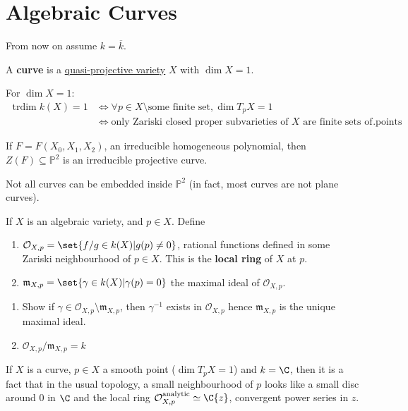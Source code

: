 \documentclass{article}
\newcommand{\proj}{\mathbb{P}}
\DeclareMathOperator{\trdim}{trdim}
\begin{document}
\section{Algebraic Curves}
From now on assume $k = \overline{k}$.
\begin{defi}
    A \textbf{curve} is a \hyperlink{def:quasiProjVar}{quasi-projective variety} $X$ with $\dim X = 1$.
\end{defi}
For $\dim X = 1$:
\begin{align*}
    \trdim k(X) = 1 &\iff \forall p \in X \setminus \text{some finite set}, \dim T_p X = 1 \\
                    &\iff \text{only Zariski closed proper subvarieties of $X$ are finite sets of points}.
\end{align*}
\begin{eg}
    If $F = F(X_0, X_1, X_2)$, an irreducible homogeneous polynomial, then $Z(F) \subseteq \proj^2$ is an irreducible projective curve.
\end{eg}
\begin{warning}
    Not all curves can be embedded inside $\proj^2$ (in fact, most curves are not plane curves).
\end{warning}
\begin{defi}
    If $X$ is an algebraic variety, and $p \in X$. Define
    \begin{enumerate}[label=(\roman*)]
        \item $\mathcal{O}_{X, p} = \set{f / g \in k(X) | g(p) \neq 0}$, rational functions defined in some Zariski neighbourhood of $p \in X$. This is the \textbf{local ring} of $X$ at $p$.
        \item $\mathfrak{m}_{X, p} = \set{\gamma \in k(X) | \gamma(p) = 0}$ the maximal ideal of $\mathcal{O}_{X, p}$.
    \end{enumerate}
\end{defi}
\begin{ex}\leavevmode
    \begin{enumerate}[label=(\roman*)]
        \item Show if $\gamma \in \mathcal{O}_{X, p} \setminus \mathfrak{m}_{X, p}$, then $\gamma^{-1}$ exists in $\mathcal{O}_{X, p}$ hence $\mathfrak{m}_{X, p}$ is the unique maximal ideal.
        \item $\mathcal{O}_{X, p} / \mathfrak{m}_{X, p} = k$
    \end{enumerate}
\end{ex}
If $X$ is a curve, $p \in X$ a smooth point ($\dim T_p X = 1$) and $k = \C$, then it is a fact that in the usual topology, a small neighbourhood of $p$ looks like a small disc around $0$ in $\C$ and the local ring $\mathcal{O}_{X, p}^\text{analytic} \simeq \C \{z\}$, convergent power series in $z$.
\end{document}
